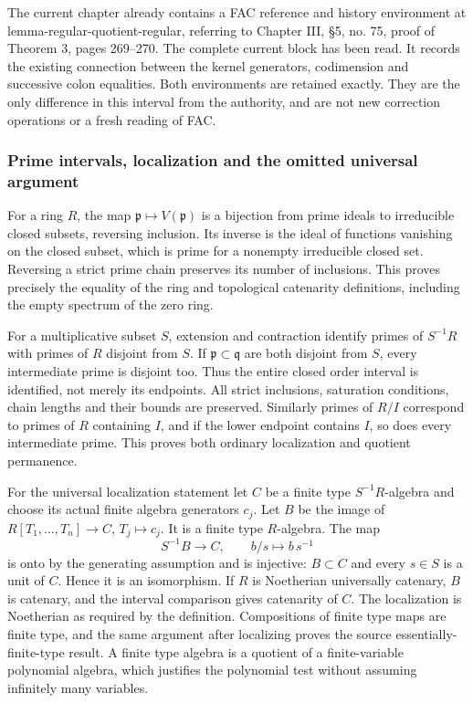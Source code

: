 The current chapter already contains a FAC reference and history environment at lemma-\AlgebraIdentifierBreak{}regular-\AlgebraIdentifierBreak{}quotient-\AlgebraIdentifierBreak{}regular, referring to Chapter III, §5, no. 75, proof of Theorem 3, pages 269--270. The complete current block has been read. It records the existing connection between the kernel generators, codimension and successive colon equalities. Both environments are retained exactly. They are the only difference in this interval from the authority, and are not new correction operations or a fresh reading of FAC.

\subsubsection{Prime intervals, localization and the omitted universal argument}\label{algebra-proof-020-prime-intervals-localization-and-the-omitted-universal-argument}

For a ring \(R\), the map \(\mathfrak p\mapsto V(\mathfrak p)\) is a bijection from prime ideals to irreducible closed subsets, reversing inclusion. Its inverse is the ideal of functions vanishing on the closed subset, which is prime for a nonempty irreducible closed set. Reversing a strict prime chain preserves its number of inclusions. This proves precisely the equality of the ring and topological catenarity definitions, including the empty spectrum of the zero ring.

For a multiplicative subset \(S\), extension and contraction identify primes of \(S^{-1}R\) with primes of \(R\) disjoint from \(S\). If \(\mathfrak p\subset\mathfrak q\) are both disjoint from \(S\), every intermediate prime is disjoint too. Thus the entire closed order interval is identified, not merely its endpoints. All strict inclusions, saturation conditions, chain lengths and their bounds are preserved. Similarly primes of \(R/I\) correspond to primes of \(R\) containing \(I\), and if the lower endpoint contains \(I\), so does every intermediate prime. This proves both ordinary localization and quotient permanence.

For the universal localization statement let \(C\) be a finite type \(S^{-1}R\)-algebra and choose its actual finite algebra generators \(c_j\). Let \(B\) be the image of \(R[T_1,\ldots,T_n]\to C\), \(T_j\mapsto c_j\). It is a finite type \(R\)-algebra. The map \[
 S^{-1}B\longrightarrow C,\qquad b/s\longmapsto b\,s^{-1}
\] is onto by the generating assumption and is injective: \(B\subset C\) and every \(s\in S\) is a unit of \(C\). Hence it is an isomorphism. If \(R\) is Noetherian universally catenary, \(B\) is catenary, and the interval comparison gives catenarity of \(C\). The localization is Noetherian as required by the definition. Compositions of finite type maps are finite type, and the same argument after localizing proves the source essentially-finite-type result. A finite type algebra is a quotient of a finite-variable polynomial algebra, which justifies the polynomial test without assuming infinitely many variables.

